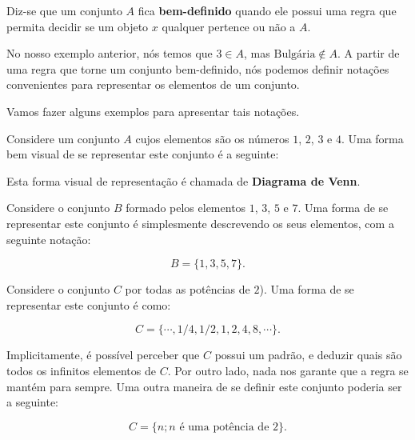 \begin{Definition}
	Diz-se que um conjunto $A$ fica \textbf{bem-definido} quando ele possui uma regra que permita decidir se um objeto $x$ qualquer pertence ou não a $A$.
\end{Definition}

No nosso exemplo anterior, nós temos que $3\in A$, mas $\text{Bulgária}\notin A$. A partir de uma regra que torne um conjunto bem-definido, nós podemos definir notações convenientes para representar os elementos de um conjunto.

Vamos fazer alguns exemplos para apresentar tais notações.

\begin{Example}
	Considere um conjunto $A$ cujos elementos são os números $1$, $2$, $3$ e $4$. Uma forma bem visual de se representar este conjunto é a seguinte:
	
	\begin{center}
	\end{center}
	
	Esta forma visual de representação é chamada de \textbf{Diagrama de Venn}.
\end{Example}

\begin{Example}
	Considere o conjunto $B$ formado pelos elementos $1$, $3$, $5$ e $7$. Uma forma de se representar este conjunto é simplesmente descrevendo os seus elementos, com a seguinte notação:
	
	$$
	B = \{1, 3, 5, 7\}.
	$$
\end{Example}

\begin{Example}
	Considere o conjunto $C$ por todas as potências de $2$). Uma forma de se representar este conjunto é como:
	
	$$
	C = \{\cdots, 1/4, 1/2, 1, 2, 4, 8, \cdots\}.
	$$
	
	Implicitamente, é possível perceber que $C$ possui um padrão, e deduzir quais são todos os infinitos elementos de $C$. Por outro lado, nada nos garante que a regra se mantém para sempre. Uma outra maneira de se definir este conjunto poderia ser a seguinte:
	
	$$
	C = \{n; \text{$n$ é uma potência de $2$}\}.
	$$
\end{Example}

